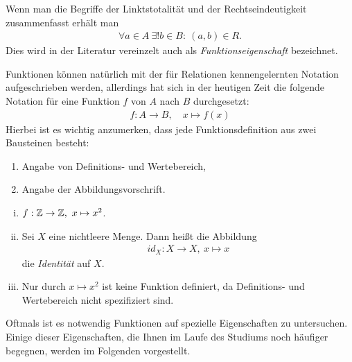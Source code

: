 \begin{remark}
    Wenn man die Begriffe der Linktstotalität und der Rechtseindeutigkeit zusammenfasst erhält man 
    \begin{align}
        \forall a \in A \  \exists ! b \in B : \ (a,b) \in R. 
    \end{align}
    Dies wird in der Literatur vereinzelt auch als \textit{Funktionseigenschaft} bezeichnet. 
\end{remark}

\begin{remark}
    Funktionen können natürlich mit der für Relationen kennengelernten Notation aufgeschrieben werden, allerdings hat sich in der heutigen Zeit die folgende Notation
    für eine Funktion $f$ von $A$ nach $B$ durchgesetzt: 
    \begin{align*}
        f : A \to B, \quad x \mapsto f(x)
    \end{align*}
    Hierbei ist es wichtig anzumerken, dass jede Funktionsdefinition aus zwei Bausteinen besteht: 
    \begin{enumerate}
        \item Angabe von Definitions- und Wertebereich,
        \item Angabe der Abbildungsvorschrift. 
    \end{enumerate}
\end{remark}

\begin{example}
    \begin{enumerate}[(i)]
        \item
        $f: \mathbb{Z} \to \mathbb{Z}, \ x \mapsto x^2 $. 
        \item 
        Sei $X$ eine nichtleere Menge. Dann heißt die Abbildung 
        \begin{align*}
            id_X : X \to X, \ x \mapsto x
        \end{align*}
        die \textit{Identität} auf $X$. 
        \item 
        Nur durch $x \mapsto x^2$ ist keine Funktion definiert, da Definitions- und Wertebereich nicht spezifiziert sind. 
    \end{enumerate}
\end{example}

Oftmals ist es notwendig Funktionen auf spezielle Eigenschaften zu untersuchen. Einige dieser Eigenschaften,
die Ihnen im Laufe des Studiums noch häufiger begegnen, werden im Folgenden vorgestellt. 

